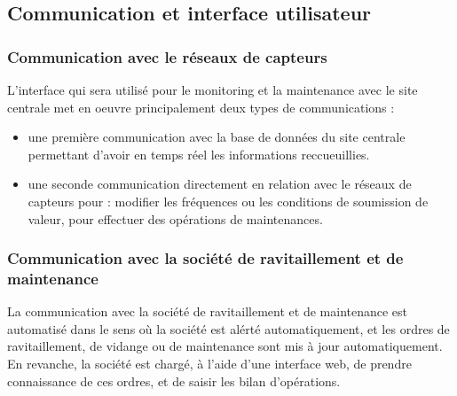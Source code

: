    \subsection{Communication et interface utilisateur}
        
        \subsubsection{Communication avec le réseaux de capteurs}
            
            L'interface qui sera utilisé pour le monitoring et la maintenance avec le site centrale met en oeuvre principalement deux types de communications :
            \begin{itemize}
                \item une première communication avec la base de données du site centrale permettant d'avoir en temps réel les informations reccueuillies.
                \item une seconde communication directement en relation avec le réseaux de capteurs pour :
                    \subitem modifier les fréquences ou les conditions de soumission de valeur,
                    \subitem pour effectuer des opérations de maintenances.
            \end{itemize}
        \subsubsection{Communication avec la société de ravitaillement et de maintenance}
            
            La communication avec la société de ravitaillement et de maintenance est automatisé dans le sens où la société est alérté automatiquement, et les ordres de ravitaillement, de vidange ou de maintenance sont mis à jour automatiquement. En revanche, la société est chargé, à l'aide d'une interface web, de prendre connaissance de ces ordres, et de saisir les bilan d'opérations.
            
